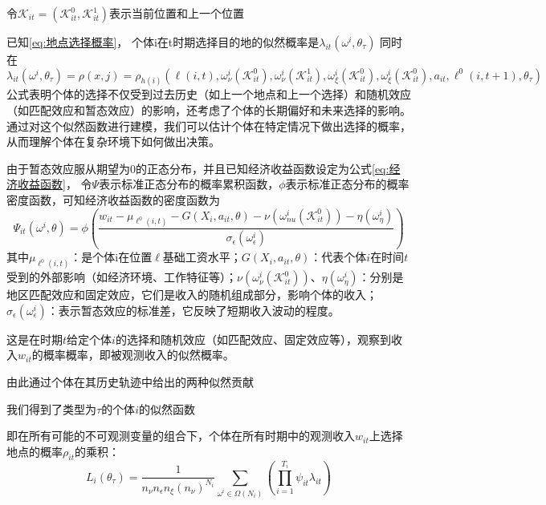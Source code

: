 \documentclass[a4paper,12pt,oneside]{book} %
\begin{document}
令$\mathcal{K}_{it}=(\mathcal{K}_{it}^{0},\mathcal{K}_{it}^{1})$表示当前位置和上一个位置

已知\ref{eq:地点选择概率}，
个体i在t时期选择目的地的似然概率是$\lambda_{it}(\omega^{i},\theta_{\tau})$
同时在
\begin{equation}
  \lambda_{it}(\omega^{i},\theta_{\tau})=\rho(x,j)=\rho_{h(i)}(\ell(i,t),\omega_{\nu}^{i}(\mathcal{K}_{it}^{0}),\omega_{\nu}^{i}(\mathcal{K}_{it}^{1}),\omega_{\xi}^{i}(\mathcal{K}_{it}^{0}),\omega_{\xi}^{i}(\mathcal{K}_{it}^{0}),a_{it},\ell^{0}(i,t+1),\theta_{\tau})
\end{equation}
公式表明个体的选择不仅受到过去历史（如上一个地点和上一个选择）和随机效应（如匹配效应和暂态效应）的影响，还考虑了个体的长期偏好和未来选择的影响。
通过对这个似然函数进行建模，我们可以估计个体在特定情况下做出选择的概率，从而理解个体在复杂环境下如何做出决策。


由于暂态效应服从期望为$0$的正态分布，并且已知经济收益函数设定为公式\ref{eq:经济收益函数}，
令$\Psi$表示标准正态分布的概率累积函数，$\phi$表示标准正态分布的概率密度函数，可知经济收益函数的密度函数为
\begin{equation}
  \Psi_{it}(\omega^{i},\theta)=\phi(\frac{w_{it} - \mu_{\ell^{0}(i,t)}-G(X_{i},a_{it},\theta)-\nu(\omega_{nu}^{i}(\mathcal{K}_{it}^{0}))-\eta(\omega_{\eta}^{i})  }{\sigma_{\epsilon}(\omega_{\epsilon}^{i})})
\end{equation}
其中$\mu_{\ell^{0}(i,t)}$：是个体i在位置$\ell$基础工资水平；$G(X_i, a_{it}, \theta)$：代表个体$i$在时间$t$受到的外部影响（如经济环境、工作特征等）；$\nu(\omega_{\nu}^i(\mathcal{K}_{it}^0))$、$\eta(\omega_{\eta}^i)$：分别是地区匹配效应和固定效应，它们是收入的随机组成部分，影响个体的收入；$\sigma_{\epsilon}(\omega_{\epsilon}^i)$：表示暂态效应的标准差，它反映了短期收入波动的程度。

这是在时期$t$给定个体$i$的选择和随机效应（如匹配效应、固定效应等），观察到收入$w_{it}$的概率概率，即被观测收入的似然概率。

由此通过个体在其历史轨迹中给出的两种似然贡献

我们得到了类型为$\tau$的个体$i$的似然函数

即在所有可能的不可观测变量的组合下，个体在所有时期中的观测收入$w_{it}$上选择地点的概率$\rho_{it}$的乘积：
\begin{equation}
  L_{i}(\theta_{\tau})=\frac{1}{n_{\nu}n_{\epsilon}n_{\xi}(n_{\nu})^{N_{i}}} \sum\limits_{\omega^{i}\in\Omega(N_{i})}(\prod\limits_{i=1}^{T_{i}} \psi_{it}\lambda_{it})
\end{equation}
\end{document}
